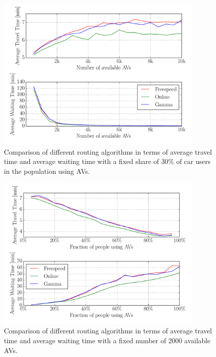 \begin{figure}
    \centering
    \includegraphics[width=0.9\textwidth]{figures/relaxed_routing_fraction.pdf}
    \caption{Comparison of different routing algorithms in terms of average travel time and average
    waiting time with a fixed share of 30\% of car users in the population using AVs.}
    \label{fig:relaxed_routing_fraction}
\end{figure}

\begin{figure}
    \centering
    \includegraphics[width=0.9\textwidth]{figures/relaxed_routing_supply.pdf}
    \caption{Comparison of different routing algorithms in terms of average travel time and average
    waiting time with a fixed number of 2000 available AVs.}
    \label{fig:relaxed_routing_supply}
\end{figure}

